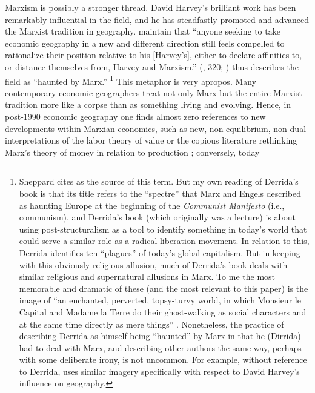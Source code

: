 Marxism is possibly a stronger thread. David Harvey's brilliant work
\citep[esp.][]{harvey2006thelimits} has been remarkably influential
in the field, and he has steadfastly promoted and advanced the Marxist
tradition in geography. \citet{sheppard2012thelong} maintain that
``anyone seeking to take economic geography in a new and different
direction still feels compelled to rationalize their position relative
to his {[}Harvey's{]}, either to declare affinities to, or distance
themselves from, Harvey and Marxism.'' \citeauthor{sheppard2011geographical}(\citeyear{sheppard2011geographical},
320; \citealt[11]{sheppard2012thelong}) thus describes the field
as ``haunted by Marx.'' \footnote{Sheppard cites \citet{derrida25specters} as the source of this term.
But my own reading of Derrida's book is that its title refers to the
``spectre'' that Marx and Engels described as haunting Europe at
the beginning of the \emph{Communist Manifesto} (i.e., communism),
and Derrida's book (which originally was a lecture) is about using
post-structuralism as a tool to identify something in today's world
that could serve a similar role as a radical liberation movement.
In relation to this, Derrida identifies ten ``plagues'' of today's
global capitalism. But in keeping with this obviously religious allusion,
much of Derrida's book deals with similar religious and supernatural
allusions in Marx. To me the most memorable and dramatic of these
(and the most relevant to this paper) is the image of ``an enchanted,
perverted, topsy-turvy world, in which Monsieur le Capital and Madame
la Terre do their ghost-walking as social characters and at the same
time directly as mere things'' \citep[830]{marx1967capital}. Nonetheless,
the practice of describing Derrida as himself being ``haunted''
by Marx in that he (Dirrida) had to deal with Marx, and describing
other authors the same way, perhaps with some deliberate irony, is
not uncommon. For example, without reference to Derrida, \citet{walker2004thespectre}
uses similar imagery specifically with respect to David Harvey's influence
on geography.} This metaphor is very apropos. Many contemporary economic geographers
treat not only Marx but the entire Marxist tradition more like a corpse
than as something living and evolving. Hence, in post-1990 economic
geography one finds almost zero references to new developments within
Marxian economics, such as new, non-equilibrium, non-dual interpretations
of the labor theory of value \citep{freeman2010trendsin} or the copious
literature rethinking Marx's theory of money in relation to production
\citep{graziani2003themonetary,wray1999theories}; conversely, today
